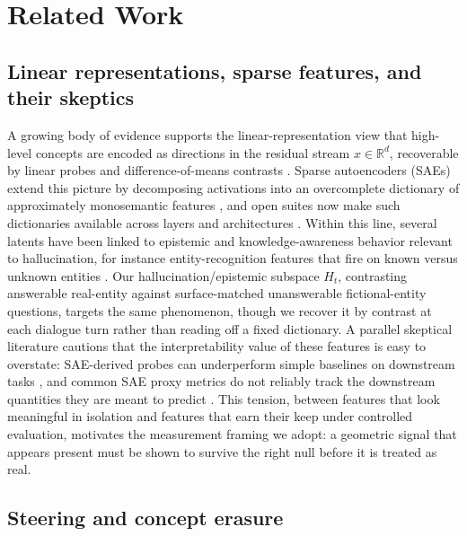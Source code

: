 \section{Related Work}
\label{sec:related}

\subsection{Linear representations, sparse features, and their skeptics}

A growing body of evidence supports the linear-representation view that high-level concepts are encoded as directions in the residual stream $x \in \mathbb{R}^d$, recoverable by linear probes and difference-of-means contrasts \citep{marks2023geometry}. Sparse autoencoders (SAEs) extend this picture by decomposing activations into an overcomplete dictionary of approximately monosemantic features \citep{bricken2023monosemanticity,cunningham2023sparse,templeton2024scaling}, and open suites now make such dictionaries available across layers and architectures \citep{lieberum2024gemmascope,gao2024scaling,rajamanoharan2024jumprelu}. Within this line, several latents have been linked to epistemic and knowledge-awareness behavior relevant to hallucination, for instance entity-recognition features that fire on known versus unknown entities \citep{ferrando2025entity}. Our hallucination/epistemic subspace $H_t$, contrasting answerable real-entity against surface-matched unanswerable fictional-entity questions, targets the same phenomenon, though we recover it by contrast at each dialogue turn rather than reading off a fixed dictionary. A parallel skeptical literature cautions that the interpretability value of these features is easy to overstate: SAE-derived probes can underperform simple baselines on downstream tasks \citep{kantamneni2025useful}, and common SAE proxy metrics do not reliably track the downstream quantities they are meant to predict \citep{karvonen2025saebench}. This tension, between features that look meaningful in isolation and features that earn their keep under controlled evaluation, motivates the measurement framing we adopt: a geometric signal that appears present must be shown to survive the right null before it is treated as real.

\subsection{Steering and concept erasure}


